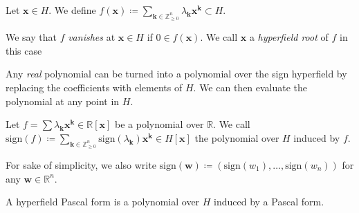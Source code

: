 \begin{definition}
    Let \( \mathbf{x} \in H \). We define \( f(\mathbf{x}) \coloneqq \sum_{\mathbf{k} \in \mathbb{Z}^n_{\geq 0}} \lambda_{\mathbf{k}} \mathbf{x}^{\mathbf{k}} \subset H \).
\end{definition}

\begin{definition}
    We say that \( f \) \emph{vanishes} at \( \mathbf{x} \in H \) if \( 0 \in f(\mathbf{x}) \). We call \( \mathbf{x} \) a \emph{hyperfield root} of \( f \) in this case
\end{definition}


Any \emph{real} polynomial can be turned into a polynomial over the sign hyperfield by replacing the coefficients with elements of \( H \). We can then evaluate the polynomial at any point in \( H \).

\begin{definition}
    Let \( f = \sum \lambda_{\mathbf{k}} \mathbf{x}^{\mathbf{k}} \in \mathbb{R}[\mathbf{x}] \) be a polynomial over \( \mathbb{R} \). We call \( \mathrm{sign}(f) \coloneqq \sum_{\mathbf{k} \in \mathbb{Z}^n_{\geq 0}} \mathrm{sign}(\lambda_{\mathbf{k}}) \mathbf{x}^{\mathbf{k}} \in H[\mathbf{x}] \)
    the polynomial over \( H \) induced by \( f \).
\end{definition}

For sake of simplicity, we also write \(  \mathrm{sign}(\mathbf{w}) \coloneqq (\mathrm{sign}(w_1), \dots, \mathrm{sign}(w_n)) \) for any \( \mathbf{w} \in \mathbb{R}^n \).

\begin{definition}
    A hyperfield Pascal form is a polynomial over \( H \) induced by a Pascal form.
\end{definition}



